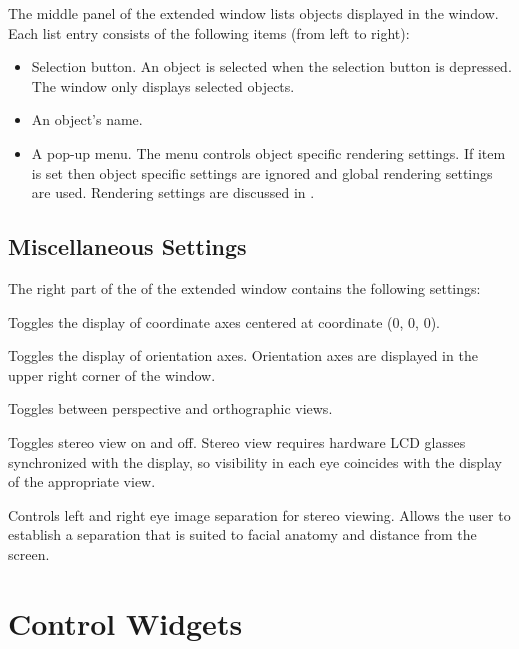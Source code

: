 The middle panel of the extended \viewer{} window lists objects
displayed in the \viewer{} window.  Each list entry consists of the
following items (from left to right):

\begin{itemize}
\item Selection button.  An object is selected when the selection
  button is depressed.  The \viewer{} window only displays selected
  objects.
\item An object's name.
\item A  pop-up menu.  The  menu
  controls object specific rendering settings.  If item  is set then object specific settings are ignored
  and global rendering settings are used.  Rendering settings
  are discussed in .
\end{itemize}


\subsection{Miscellaneous Settings}

The right part of the of the extended \viewer{} window contains the
following settings:

\begin{description}
 Toggles the display of coordinate axes centered at
coordinate (0, 0, 0).

 Toggles the display of orientation axes.
Orientation axes are displayed in the upper right corner of the
\viewer{} window.

 Toggles between perspective and orthographic views.

 Toggles stereo view on and off.  Stereo view
requires hardware LCD glasses synchronized with the display, so
visibility in each eye coincides with the display of the appropriate
view.

 Controls left and right eye image separation
for stereo viewing.  Allows the user to establish a separation that is
suited to facial anatomy and distance from the screen.

\end{description}


\section{Control Widgets}
\label{sec:view-widgets} 

